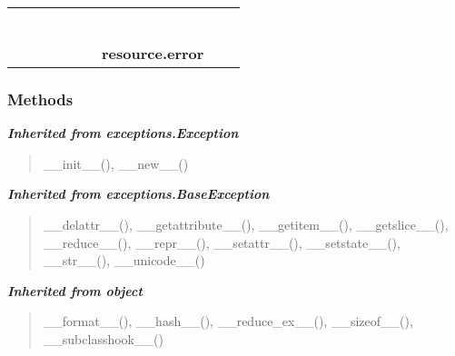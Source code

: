    \label{resource:error}
\begin{tabular}{cccccccccc}
\multicolumn{2}{r}{\settowidth{\BCL}{object}\multirow{2}{\BCL}{object}}
&&
&&
&&
  \\\cline{3-3}
  &&\multicolumn{1}{c|}{}
&&
&&
&&
  \\
\multicolumn{4}{r}{\settowidth{\BCL}{exceptions.BaseException}\multirow{2}{\BCL}{exceptions.BaseException}}
&&
&&
  \\\cline{5-5}
  &&&&\multicolumn{1}{c|}{}
&&
&&
  \\
\multicolumn{6}{r}{\settowidth{\BCL}{exceptions.Exception}\multirow{2}{\BCL}{exceptions.Exception}}
&&
  \\\cline{7-7}
  &&&&&&\multicolumn{1}{c|}{}
&&
  \\
&&&&&&\multicolumn{2}{l}{\textbf{resource.error}}
\end{tabular}



  \subsubsection{Methods}


\large{\textbf{\textit{Inherited from exceptions.Exception}}}

\begin{quote}
\_\_init\_\_(), \_\_new\_\_()
\end{quote}

\large{\textbf{\textit{Inherited from exceptions.BaseException}}}

\begin{quote}
\_\_delattr\_\_(), \_\_getattribute\_\_(), \_\_getitem\_\_(), \_\_getslice\_\_(), \_\_reduce\_\_(), \_\_repr\_\_(), \_\_setattr\_\_(), \_\_setstate\_\_(), \_\_str\_\_(), \_\_unicode\_\_()
\end{quote}

\large{\textbf{\textit{Inherited from object}}}

\begin{quote}
\_\_format\_\_(), \_\_hash\_\_(), \_\_reduce\_ex\_\_(), \_\_sizeof\_\_(), \_\_subclasshook\_\_()
\end{quote}

